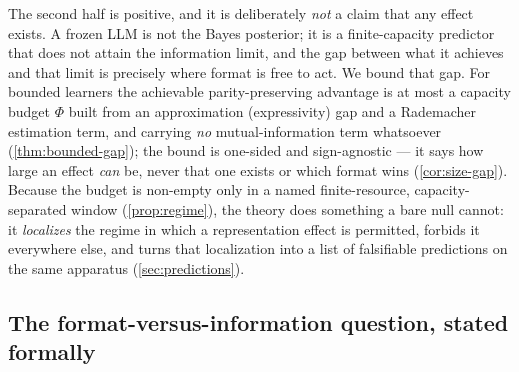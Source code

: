 The second half is positive, and it is deliberately \emph{not} a claim that any
effect exists. A frozen LLM is not the Bayes posterior; it is a
finite-capacity predictor that does not attain the information limit, and the
gap between what it achieves and that limit is precisely where format is free to
act. We bound that gap. For bounded learners the achievable
parity-preserving advantage is at most a capacity budget $\Phi$ built from an
approximation (expressivity) gap and a Rademacher estimation term, and carrying
\emph{no} mutual-information term whatsoever (\cref{thm:bounded-gap}); the bound
is one-sided and sign-agnostic --- it says how large an effect \emph{can} be,
never that one exists or which format wins (\cref{cor:size-gap}). Because the
budget is non-empty only in a named finite-resource, capacity-separated window
(\cref{prop:regime}), the theory does something a bare null cannot: it
\emph{localizes} the regime in which a representation effect is permitted,
forbids it everywhere else, and turns that localization into a list of
falsifiable predictions on the same apparatus (\cref{sec:predictions}).

\subsection{The format-versus-information question, stated formally}
\label{subsec:intro-question}

